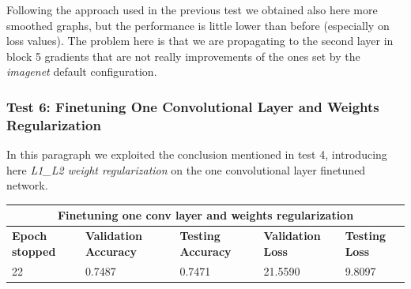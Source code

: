 Following the approach used in the previous test we obtained also here more smoothed graphs, but the performance is little lower than before (especially on loss values). The problem here is that we are propagating to the second layer in block 5 gradients that are not really improvements of the ones set by the \textit{imagenet} default configuration.






\subsubsection{Test 6: Finetuning One Convolutional Layer and Weights Regularization}
In this paragraph we exploited the conclusion mentioned in test 4, introducing here \textit{L1\_L2 weight regularization} on the one convolutional layer finetuned network.


\medskip

\begin{tabular}{ |p{2cm}|p{2cm}|p{2cm}|p{2cm}|p{2cm}|  }
\hline
\multicolumn{5}{|c|}{Finetuning one conv layer and weights regularization} \\
\hline
\textbf{Epoch stopped} & \textbf{Validation Accuracy} & \textbf{Testing Accuracy} & \textbf{Validation Loss} & \textbf{Testing Loss} \\
\hline
22& 0.7487 & 0.7471 & 21.5590 & 9.8097\\
\hline
\end{tabular}

\medskip

